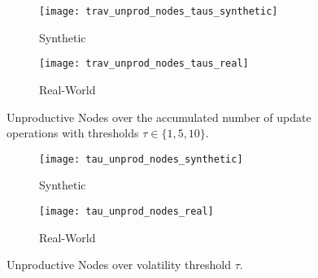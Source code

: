 \documentclass[abstracton,12pt]{scrartcl}
\theoremstyle{definition}
\begin{document}


\vspace{-0.3cm}

\begin{figure}[H]
  \centering
   \begin{subfigure}{0.49\linewidth}
    \centering
    \caption{Synthetic}
    \texttt{[image: trav\_unprod\_nodes\_taus\_synthetic]}
    \label{fig:trav_unprod_nodes_taus_synthetic}
  \end{subfigure}
  \begin{subfigure}{0.49\linewidth}
    \centering
    \caption{Real-World}
    \texttt{[image: trav\_unprod\_nodes\_taus\_real]}
    \label{fig:trav_unprod_nodes_taus_real}
  \end{subfigure}
  \vspace{-0.65cm}
  \caption[Unproductive Nodes over accumulated update operations with $\tau \in \{1,5,10\}$]{
  Unproductive Nodes over the accumulated number of update operations 
  with thresholds $\tau \in \{1,5,10\}$.}
\end{figure}

\begin{figure}[h]
  \centering
  \begin{subfigure}{0.49\linewidth}
    \centering
    \caption{Synthetic}
    \texttt{[image: tau\_unprod\_nodes\_synthetic]}
    \label{fig:tau_unprod_nodes_synthetic}
  \end{subfigure}
  \begin{subfigure}{0.49\linewidth}
    \centering
    \caption{Real-World}
    \texttt{[image: tau\_unprod\_nodes\_real]}
    \label{fig:tau_unprod_nodes_real}
  \end{subfigure}
  \vspace{-0.65cm}
  \caption[Unproductive Nodes over volatility threshold $\tau$]{
  Unproductive Nodes over volatility threshold $\tau$.}
\end{figure}
\end{document}
